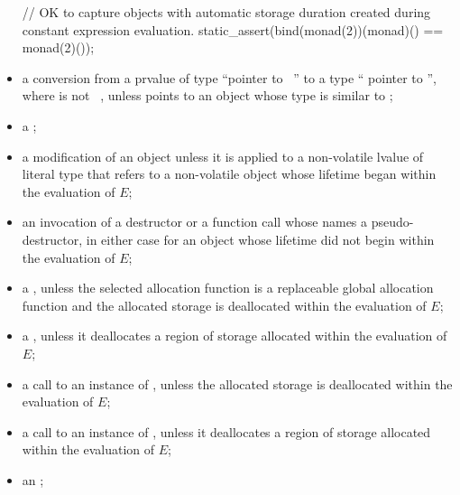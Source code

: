 \begin{itemize}
\begin{note}
\begin{example}
\begin{codeblock}
// OK to capture objects with automatic storage duration created during constant expression evaluation.
static_assert(bind(monad(2))(monad)() == monad(2)());
\end{codeblock}
\end{example}
\end{note}

\item
a conversion
from a prvalue  of type ``pointer to \cv{}~''
to a type `` pointer to  '',
where   is not ~,
unless  points to an object whose type is similar to ;

\item
a ;

\item
a modification of an object
unless it is applied to a non-volatile lvalue of literal type
that refers to a non-volatile object
whose lifetime began within the evaluation of $E$;

\item
an invocation of a destructor or a function call
whose  names a pseudo-destructor,
in either case for an object whose lifetime did not begin within the evaluation of $E$;

\item
a ,
unless the selected allocation function is
a replaceable global allocation function and
the allocated storage is deallocated within the evaluation of $E$;

\item
a ,
unless it deallocates a region of storage
allocated within the evaluation of $E$;

\item
a call to an instance of
,
unless the allocated storage is deallocated within the evaluation of $E$;

\item
a call to an instance of
,
unless it deallocates a region of storage
allocated within the evaluation of $E$;

\item
an ;


\end{itemize}
